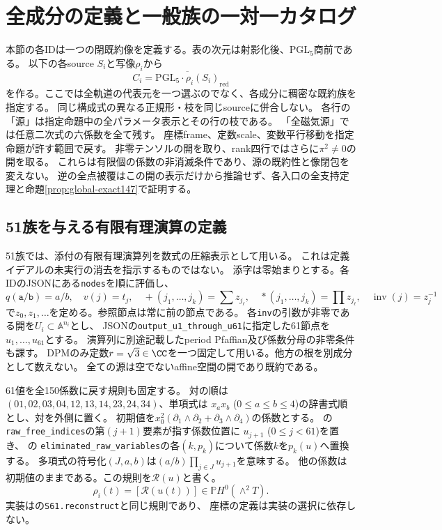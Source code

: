 \section{全成分の定義と一般族の一対一カタログ}\label{sec:component-catalogue}
本節の各IDは一つの閉既約像を定義する。表の次元は射影化後、$\mathrm{PGL}_5$商前である。
以下の各source $S_i$と写像$\rho_i$から
\[
 C_i=\overline{\mathrm{PGL}_5\cdot\rho_i(S_i)}_{\mathrm{red}}
\]
を作る。ここでは全軌道の代表元を一つ選ぶのでなく、各成分に稠密な既約族を指定する。
同じ構成式の異なる正規形・枝を同じsourceに併合しない。
各行の「源」は指定命題中の全パラメータ表示とその行の枝である。
「全磁気源」では任意二次式の六係数を全て残す。
座標frame、定数scale、変数平行移動を指定命題が許す範囲で戻す。
非零テンソルの開を取り、rank四行ではさらに$\pi^2\ne0$の開を取る。
これらは有限個の係数の非消滅条件であり、源の既約性と像閉包を変えない。
逆の全点被覆はこの開の表示だけから推論せず、各入口の全支持定理と命題\ref{prop:global-exact147}で証明する。

\subsection{51族を与える有限有理演算の定義}\label{source:circuits51}
51族では、添付の有限有理演算列を数式の圧縮表示として用いる。
これは定義イデアルの未実行の消去を指示するものではない。
添字は零始まりとする。各IDのJSONにある\texttt{nodes}を順に評価し、
\[
 q(\texttt{a/b})=a/b,\quad v(j)=t_j,\quad +(j_1,\ldots,j_k)=\sum z_{j_\ell},\quad
 *(j_1,\ldots,j_k)=\prod z_{j_\ell},\quad \operatorname{inv}(j)=z_j^{-1}
\]
で$z_0,z_1,\ldots$を定める。参照節点は常に前の節点である。
各\texttt{inv}の引数が非零である開を$U_i\subset\mathbb A^{n_i}$とし、
JSONの\texttt{output\_u1\_through\_u61}に指定した61節点を$u_1,\ldots,u_{61}$とする。
演算列に別途記載したperiod Pfaffian及び係数分母の非零条件も課す。
DPMのみ定数$r=\sqrt3\in\CC$を一つ固定して用いる。他方の根を別成分として数えない。
全ての源は空でないaffine空間の開であり既約である。

61値を全150係数に戻す規則も固定する。
対の順は$(01,02,03,04,12,13,14,23,24,34)$、単項式は
$x_ax_b$ ($0\le a\le b\le4$)の辞書式順とし、対を外側に置く。
初期値を$x_0^2(\partial_1\wedge\partial_2+\partial_3\wedge\partial_4)$の係数とする。
の
\texttt{raw\_free\_indices}の第$(j+1)$要素が指す係数位置に
$u_{j+1}$ ($0\le j<61$)を置き、
の
\texttt{eliminated\_raw\_variables}の各$(k,p_k)$について係数$k$を$p_k(u)$へ置換する。
多項式の符号化$(J,a,b)$は$(a/b)\prod_{j\in J}u_{j+1}$を意味する。
他の係数は初期値のままである。この規則を$\mathcal R(u)$と書く。
\[
 \rho_i(t)=[\mathcal R(u(t))]\in\mathbb P H^0(\wedge^2T).
\]
実装はの\texttt{S61.reconstruct}と同じ規則であり、
座標の定義は実装の選択に依存しない。

